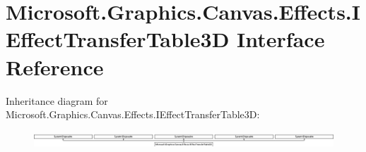 \hypertarget{interface_microsoft_1_1_graphics_1_1_canvas_1_1_effects_1_1_i_effect_transfer_table3_d}{}\section{Microsoft.\+Graphics.\+Canvas.\+Effects.\+I\+Effect\+Transfer\+Table3D Interface Reference}
\label{interface_microsoft_1_1_graphics_1_1_canvas_1_1_effects_1_1_i_effect_transfer_table3_d}
Inheritance diagram for Microsoft.\+Graphics.\+Canvas.\+Effects.\+I\+Effect\+Transfer\+Table3D\+:\begin{figure}[H]
\begin{center}
\leavevmode
\includegraphics[height=0.634561cm]{interface_microsoft_1_1_graphics_1_1_canvas_1_1_effects_1_1_i_effect_transfer_table3_d}
\end{center}
\end{figure}
